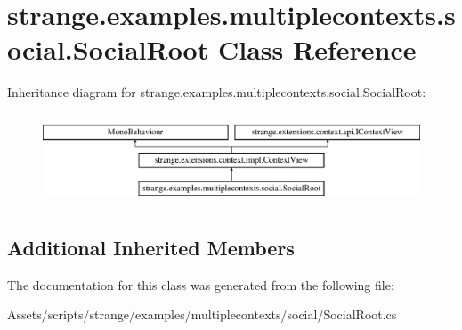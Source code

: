\hypertarget{classstrange_1_1examples_1_1multiplecontexts_1_1social_1_1_social_root}{\section{strange.\-examples.\-multiplecontexts.\-social.\-Social\-Root Class Reference}
\label{classstrange_1_1examples_1_1multiplecontexts_1_1social_1_1_social_root}
}
Inheritance diagram for strange.\-examples.\-multiplecontexts.\-social.\-Social\-Root\-:\begin{figure}[H]
\begin{center}
\leavevmode
\includegraphics[height=2.700965cm]{classstrange_1_1examples_1_1multiplecontexts_1_1social_1_1_social_root}
\end{center}
\end{figure}
\subsection*{Additional Inherited Members}


The documentation for this class was generated from the following file\-:\begin{DoxyCompactItemize}
\item 
Assets/scripts/strange/examples/multiplecontexts/social/Social\-Root.\-cs\end{DoxyCompactItemize}
